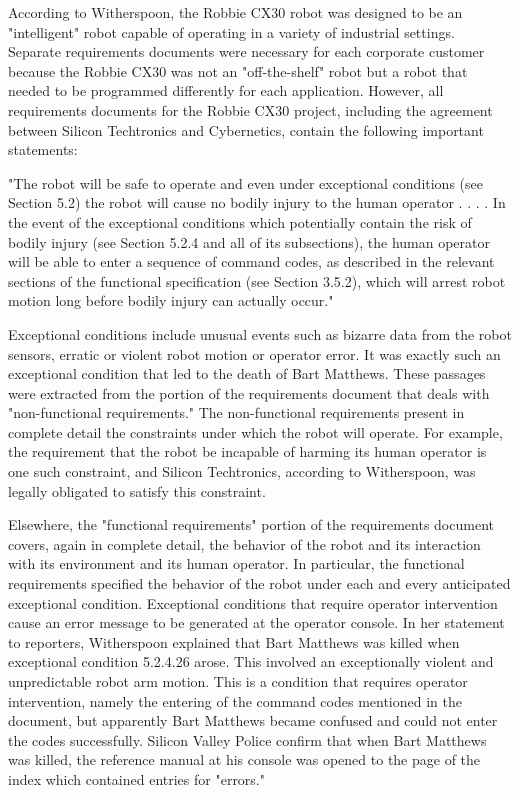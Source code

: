 According to Witherspoon, the Robbie CX30 robot was designed to be an "intelligent" robot capable of operating in a variety of industrial settings. Separate requirements documents were necessary for each corporate customer because the Robbie CX30 was not an "off-the-shelf" robot but a robot that needed to be programmed differently for each application. However, all requirements documents for the Robbie CX30 project, including the agreement between Silicon Techtronics and Cybernetics, contain the following important statements:

"The robot will be safe to operate and even under exceptional conditions (see Section 5.2) the robot will cause no bodily injury to the human operator . . . . In the event of the exceptional conditions which potentially contain the risk of bodily injury (see Section 5.2.4 and all of its subsections), the human operator will be able to enter a sequence of command codes, as described in the relevant sections of the functional specification (see Section 3.5.2), which will arrest robot motion long before bodily injury can actually occur."

Exceptional conditions include unusual events such as bizarre data from the robot sensors, erratic or violent robot motion or operator error. It was exactly such an exceptional condition that led to the death of Bart Matthews. These passages were extracted from the portion of the requirements document that deals with "non-functional requirements." The non-functional requirements present in complete detail the constraints under which the robot will operate. For example, the requirement that the robot be incapable of harming its human operator is one such constraint, and Silicon Techtronics, according to Witherspoon, was legally obligated to satisfy this constraint.

Elsewhere, the "functional requirements" portion of the requirements document covers, again in complete detail, the behavior of the robot and its interaction with its environment and its human operator. In particular, the functional requirements specified the behavior of the robot under each and every anticipated exceptional condition. Exceptional conditions that require operator intervention cause an error message to be generated at the operator console. In her statement to reporters, Witherspoon explained that Bart Matthews was killed when exceptional condition 5.2.4.26 arose. This involved an exceptionally violent and unpredictable robot arm motion. This is a condition that requires operator intervention, namely the entering of the command codes mentioned in the document, but apparently Bart Matthews became confused and could not enter the codes successfully. Silicon Valley Police confirm that when Bart Matthews was killed, the reference manual at his console was opened to the page of the index which contained entries for "errors."

